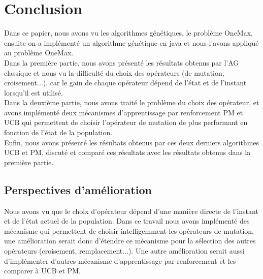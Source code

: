 \documentclass[12pt]{article}
\begin{document}
\section{Conclusion}
Dans ce papier, nous avons vu les algorithmes génétiques, le problème OneMax, ensuite on a implémenté un algorithme génétique en java et nous l'avons appliqué au problème OneMax.\\

Dans la première partie, nous avons présenté les résultats obtenus par l'AG classique et nous vu la difficulté du choix des opérateurs (de mutation, croisement...), car le gain de chaque opérateur dépend de l'état et de l'instant lorsqu'il est utilisé.\\

Dans la deuxième partie, nous avons traité le problème du choix des opérateur, et avons implémenté deux mécanismes d'apprentissage par renforcement PM et UCB qui permettent de choisir l'opérateur de mutation de plus performant en fonction de l'état de la population.\\

Enfin, nous avons présenté les résultats obtenus par ces deux derniers algorithmes UCB et PM, discuté et comparé ces résultats avec les résultats obtenus dans la première partie. 

\subsection{Perspectives d'amélioration}
Nous avons vu que le choix d'opérateur dépend d'une manière directe de l'instant et de l'état actuel de la population. Dans ce travail nous avons implémenté des mécanisme qui permettent de choisir intelligemment les opérateurs de mutation, une amélioration serait donc d'étendre ce mécanisme pour la sélection des autres opérateurs (croisement, remplacement...). Une autre amélioration serait aussi d'implémenter d'autres mécanisme d'apprentissage par renforcement et les comparer à UCB et PM. 
\end{document}
